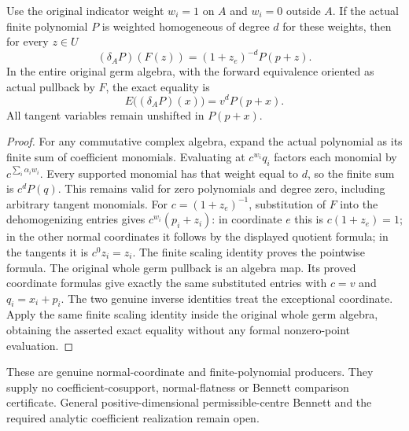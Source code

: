 \begin{theorem}
\label{hir:actual-normal-unit-weighted-polynomial-dictionary}
Use the original indicator weight $w_i=1$ on $A$ and $w_i=0$
outside $A$. If the actual finite polynomial $P$ is weighted
homogeneous of degree $d$ for these weights, then for every $z\in U$
\[
 (\delta_A P)(F(z))=(1+z_e)^{-d}P(p+z).
\]
In the entire original germ algebra, with the forward equivalence
oriented as actual pullback by $F$, the exact equality is
\[
 E\bigl((\delta_A P)(x)\bigr)=v^d P(p+x).
\]
All tangent variables remain unshifted in $P(p+x)$.
\leanok
\end{theorem}
\begin{proof}
For any commutative complex algebra, expand the actual polynomial as
its finite sum of coefficient monomials. Evaluating at
$c^{w_i}q_i$ factors each monomial by $c^{\sum_i\alpha_iw_i}$.
Every supported monomial has that weight equal to $d$, so the finite
sum is $c^d P(q)$. This remains valid for zero polynomials and
degree zero, including arbitrary tangent monomials.
For $c=(1+z_e)^{-1}$, substitution of $F$ into the dehomogenizing
entries gives $c^{w_i}(p_i+z_i)$: in coordinate $e$ this is
$c(1+z_e)=1$; in the other normal coordinates it follows by the
displayed quotient formula; in the tangents it is $c^0z_i=z_i$.
The finite scaling identity proves the pointwise formula.
The original whole germ pullback is an algebra map. Its proved
coordinate formulas give exactly the same substituted entries with
$c=v$ and $q_i=x_i+p_i$. The two genuine inverse identities treat
the exceptional coordinate. Apply the same finite scaling identity
inside the original whole germ algebra, obtaining the asserted exact
equality without any formal nonzero-point evaluation.
\end{proof}

These are genuine normal-coordinate and finite-polynomial producers.
They supply no coefficient-cosupport, normal-flatness or Bennett
comparison certificate. General positive-dimensional permissible-centre
Bennett and the required analytic coefficient realization remain open.
